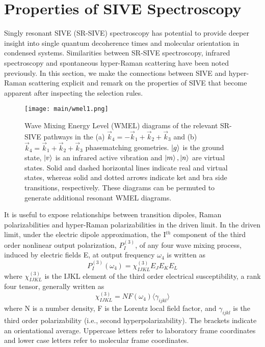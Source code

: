 \documentclass[aip, jcp, reprint, twocolumn]{revtex4-2}
\begin{document}
\section{Properties of SIVE Spectroscopy}
Singly resonant SIVE (SR-SIVE) spectroscopy has potential to provide deeper insight into single quantum decoherence times and molecular orientation in condensed systems.
Similarities between SR-SIVE spectroscopy, infrared spectroscopy and spontaneous hyper-Raman scattering have been noted previously. \cite{RN352, Bonn2024}
In this section, we make the connections between SIVE and hyper-Raman scattering explicit and remark on the properties of SIVE that become apparent after inspecting the selection rules.

\begin{figure}[!htbp]
	\centering
	\texttt{[image: main/wmel1.png]}
	\caption{Wave Mixing Energy Level (WMEL) diagrams of the relevant SR-SIVE pathways in the (a) $\vec{k}_4 = -\vec{k}_1 + \vec{k}_2 + \vec{k}_3$ and (b) $\vec{k}_4 = \vec{k}_1 + \vec{k}_2 + \vec{k}_3$ phasematching geometries. \cite{RN286, RN352}
	$\ket{g}$ is the ground state, $\ket{v}$ is an infrared active vibration and $\ket{m}, \ket{n}$ are virtual states.
	Solid and dashed horizontal lines indicate real and virtual states, whereas solid and dotted arrows indicate ket and bra side transitions, respectively. 
	These diagrams can be permuted to generate additional resonant WMEL diagrams.}
	\label{fig:sivewmel}
\end{figure}

It is useful to expose relationships between transition dipoles, Raman polarizabilities and hyper-Raman polarizabilities in the driven limit. \cite{Simpson2004, RN120}
In the driven limit, under the electric dipole approximation, the I$^{th}$ component of the third order nonlinear output polarization, ${P}^{(3)}_I$, of any four wave mixing process, induced by electric fields E, at output frequency $\omega_4$ is written as \cite{RN307}
\begin{equation} \label{polarization}
{P}^{(3)}_I (\omega_4)  = \chi^{(3)}_{IJKL} E_J E_K E_L 
\end{equation}
where $\chi^{(3)}_{IJKL}$ is the IJKL element of the third order electrical susceptibility, a rank four tensor, generally written as
\begin{equation}
	\chi^{(3)}_{IJKL} = NF(\omega_4) \langle \gamma_{ijkl} \rangle
\end{equation}
where N is a number density, F is the Lorentz local field factor, and $\gamma_{ijkl}$ is the third order polarizability (i.e., second hyperpolarizability). 
The brackets indicate an orientational average. 
Uppercase letters refer to laboratory frame coordinates and lower case letters refer to molecular frame coordinates.
\end{document}
